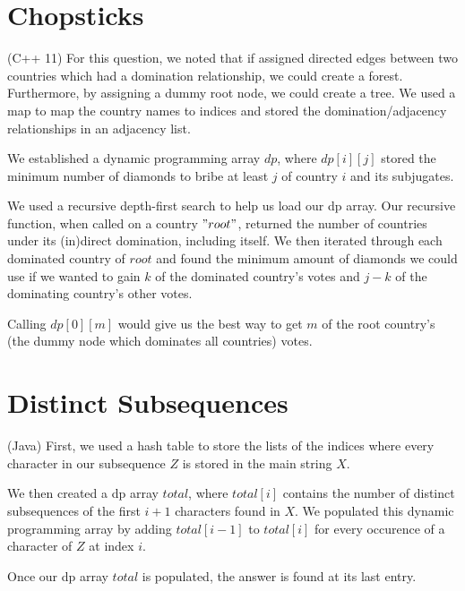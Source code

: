 \documentclass{article}
\begin{document}
\section{Chopsticks}
(C++ 11) For this question, we noted that if assigned directed edges between two countries which had a domination relationship, we could create a forest. Furthermore, by assigning a dummy root node, we could create a tree. We used a map to map the country names to indices and stored the domination/adjacency relationships in an adjacency list.
\par 
We established a dynamic programming array $dp$, where $dp[i][j]$ stored the minimum number of diamonds to bribe at least $j$ of country $i$ and its subjugates.
\par 
We used a recursive depth-first search to help us load our dp array. Our recursive function, when called on a country $"root"$, returned the number of countries under its (in)direct domination, including itself. We then iterated through each dominated country of $root$ and found the minimum amount of diamonds we could use if we wanted to gain $k$ of the dominated country's votes and $j-k$ of the dominating country's other votes.
\par 
Calling $dp[0][m]$ would give us the best way to get $m$ of the root country's (the dummy node which dominates all countries) votes.

\section{Distinct Subsequences}
(Java) First, we used a hash table to store the lists of the indices where every character in our subsequence $Z$ is stored in the main string $X$.
\par 
We then created a dp array $total$, where $total[i]$ contains the number of distinct subsequences of the first $i+1$ characters found in $X$. We populated this dynamic programming array by adding  $total[i-1]$ to $total[i]$ for every occurence of a character of $Z$ at index $i$.
\par 
Once our dp array $total$ is populated, the answer is found at its last entry.
\end{document}
